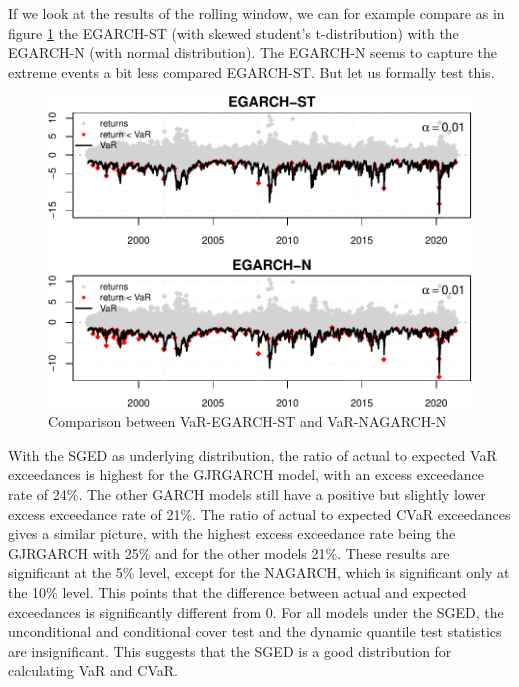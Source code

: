 \documentclass[a4paper, nobind]{templates/ociamthesis}
\begin{document}
\noindent If we look at the results of the rolling window, we can for example compare as in figure \ref{fig:figurebacktests2} the EGARCH-ST (with skewed student's t-distribution) with the EGARCH-N (with normal distribution). The EGARCH-N seems to capture the extreme events a bit less compared EGARCH-ST. But let us formally test this.~\\

\newpage

\begin{figure}[h]

{\centering \includegraphics[width=0.9\linewidth]{_main_files/figure-latex/figurebacktests2-1} 

}

\caption{Comparison between VaR-EGARCH-ST and VaR-NAGARCH-N}\label{fig:figurebacktests2}
\end{figure}

With the SGED as underlying distribution, the ratio of actual to expected VaR exceedances is highest for the GJRGARCH model, with an excess exceedance rate of 24\%. The other GARCH models still have a positive but slightly lower excess exceedance rate of 21\%. The ratio of actual to expected CVaR exceedances gives a similar picture, with the highest excess exceedance rate being the GJRGARCH with 25\% and for the other models 21\%. These results are significant at the 5\% level, except for the NAGARCH, which is significant only at the 10\% level. This points that the difference between actual and expected exceedances is significantly different from 0. For all models under the SGED, the unconditional and conditional cover test and the dynamic quantile test statistics are insignificant. This suggests that the SGED is a good distribution for calculating VaR and CVaR.
\end{document}
